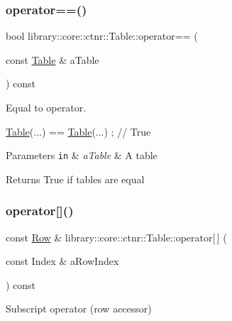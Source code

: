 \subsubsection{\texorpdfstring{operator==()}{operator==()}}
{\footnotesize\ttfamily bool library\+::core\+::ctnr\+::\+Table\+::operator== (\begin{DoxyParamCaption}\item[{const \hyperlink{classlibrary_1_1core_1_1ctnr_1_1_table}{Table} \&}]{a\+Table }\end{DoxyParamCaption}) const}



Equal to operator. 


\begin{DoxyCode}
\hyperlink{classlibrary_1_1core_1_1ctnr_1_1_table_a5b11121caa4288c3da642af7c6a5a632}{Table}(...) == \hyperlink{classlibrary_1_1core_1_1ctnr_1_1_table_a5b11121caa4288c3da642af7c6a5a632}{Table}(...) ; \textcolor{comment}{// True}
\end{DoxyCode}



\begin{DoxyParams}[1]{Parameters}
\mbox{\tt in}  & {\em a\+Table} & A table \\
\hline
\end{DoxyParams}
\begin{DoxyReturn}{Returns}
True if tables are equal 
\end{DoxyReturn}
\mbox{\label{classlibrary_1_1core_1_1ctnr_1_1_table_ae0b163e13fe6dc832c103ca7f89a0ca3}} 
\subsubsection{\texorpdfstring{operator[]()}{operator[]()}}
{\footnotesize\ttfamily const \hyperlink{classlibrary_1_1core_1_1ctnr_1_1table_1_1_row}{Row} \& library\+::core\+::ctnr\+::\+Table\+::operator\mbox{[}$\,$\mbox{]} (\begin{DoxyParamCaption}\item[{const Index \&}]{a\+Row\+Index }\end{DoxyParamCaption}) const}



Subscript operator (row accessor) 


